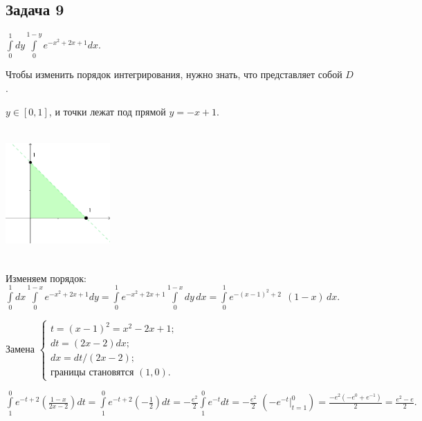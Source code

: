 \documentclass[a4paper, fleqn]{article}
\begin{document}
    \subsection*{Задача 9}
    
    $\int\limits_{0}^{1} dy \int\limits_{0}^{1 - y} e^{-x^2 + 2x + 1} dx.$
    
    Чтобы изменить порядок интегрирования, нужно знать, что представляет собой $D$.
    
    $y \in [0,1]$, и точки лежат под прямой $y = -x + 1$.
    
    \includegraphics[width=4cm, height=5cm]{task 9.png}
    
    Изменяем порядок: $\int\limits_{0}^{1} dx \int\limits_{0}^{1 - x} e^{-x^2 + 2x + 1} dy = 
    \int\limits_{0}^{1} e^{-x^2 + 2x + 1}  \int\limits_{0}^{1 - x} dy \, dx =
    \int\limits_{0}^{1} e^{-(x - 1)^2 + 2} \; \, (1 - x) \, dx.$  
    
    Замена $\begin{cases}
    t = (x - 1)^2 = x^2 - 2x + 1;\\
    dt = (2x - 2)dx;\\
    dx = dt/(2x - 2);\\
    \text{границы становятся } (1, 0).
    \end{cases}$
    
    $\int\limits_{1}^{0} e^{-t + 2} \left( \frac{1 - x}{2x - 2}\right) dt = \int\limits_{1}^{0} e^{-t + 2} \left( - \frac{1}{2}\right) dt = -\frac{e^2}{2} \int\limits_{1}^{0} e^{-t} dt = -\frac{e^2}{2} \, \, \left(-e^{-t} \Bigg|_{t = 1}^{0} \right)=  \frac{-e^2(-e^0 + e^{-1})}{2} = \frac{e^2 - e}{2}.$
    
\end{document}
